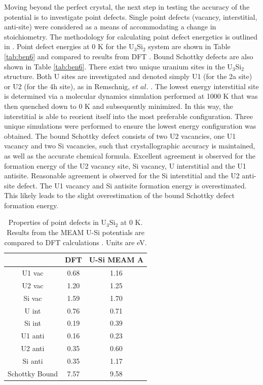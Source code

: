 \documentclass[review]{elsarticle}
\begin{document}
Moving beyond the perfect crystal, the next step in testing the accuracy of the potential is to investigate point defects.  Single point defects (vacancy, interstitial, anti-site) were considered as a means of accommodating a change in stoichiometry.  The methodology for calculating point defect energetics is outlined in \cite{middleburgh2016}.  Point defect energies at 0 K for the U$_{3}$Si$_{2}$ system are shown in Table \ref{tab:ben6} and compared to results from DFT \cite{middleburgh2016}.  Bound Schottky defects are also shown in Table \ref{tab:ben6}.  There exist two unique uranium sites in the U$_{3}$Si$_{2}$ structure.  Both U sites are investigated and denoted simply U1 (for the 2a site) or U2 (for the 4h site), as in Remschnig, $\textit{et al.}$ \cite{remschnig1992}.  The lowest energy interstitial site is determined via a molecular dynamics simulation performed at 1000 K that was then quenched down to 0 K and subsequently minimized.   In this way, the interstitial is able to reorient itself into the most preferable configuration.  Three unique simulations were performed to ensure the lowest energy configuration was obtained.  The bound Schottky defect consists of two U2 vacancies, one U1 vacancy and two Si vacancies, such that crystallographic accuracy is maintained, as well as the accurate chemical formula.  Excellent agreement is observed for the formation energy of the U2 vacancy site, Si vacancy, U interstitial and the U1 antisite.  Reasonable agreement is observed for the Si interstitial and the U2 anti-site defect.  The U1 vacancy and Si antisite formation energy is overestimated.  This likely leads to the slight overestimation of the bound Schottky defect formation energy.  

\begin{table}[h!]
\caption{Properties of point defects in U$_{3}$Si$_{2}$ at 0 K.  Results from the MEAM U-Si potentials are compared to DFT calculations \cite{middleburgh2016}.  Units are eV.}\label{tab:ben6}
\begin{center}
\begin{tabular}{|c|c|c|}
     \hline
      &  DFT & U-Si MEAM A \\
     \hline
     U1 vac & 0.68 & 1.16 \\
     U2 vac & 1.20 & 1.25 \\
     Si vac & 1.59 & 1.70 \\
     U int & 0.76 & 0.71 \\
     Si int & 0.19 & 0.39 \\
     U1 anti & 0.16 & 0.23 \\
     U2 anti & 0.35 & 0.60 \\
     Si anti & 0.35 & 1.17 \\
     Schottky Bound & 7.57 & 9.58  \\
     \hline
\end{tabular}
\end{center}
\label{default}
\end{table}%
\end{document}
